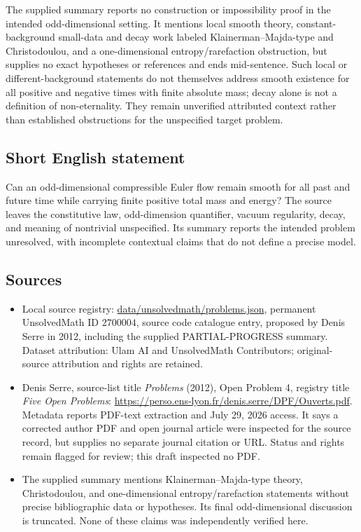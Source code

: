 \documentclass[11pt]{article}
\begin{document}
The supplied summary reports no construction or impossibility proof in the intended odd-dimensional setting. It mentions local smooth theory, constant-background small-data and decay work labeled Klainerman--Majda-type and Christodoulou, and a one-dimensional entropy/rarefaction obstruction, but supplies no exact hypotheses or references and ends mid-sentence. Such local or different-background statements do not themselves address smooth existence for all positive and negative times with finite absolute mass; decay alone is not a definition of non-eternality. They remain unverified attributed context rather than established obstructions for the unspecified target problem.
\subsection{Short English statement}
Can an odd-dimensional compressible Euler flow remain smooth for all past and future time while carrying finite positive total mass and energy? The source leaves the constitutive law, odd-dimension quantifier, vacuum regularity, decay, and meaning of nontrivial unspecified. Its summary reports the intended problem unresolved, with incomplete contextual claims that do not define a precise model.
\subsection{Sources}
\begin{itemize}
\item Local source registry: \url{data/unsolvedmath/problems.json}, permanent UnsolvedMath ID $2700004$, source code catalogue entry, proposed by Denis Serre in 2012, including the supplied PARTIAL-PROGRESS summary. Dataset attribution: Ulam AI and UnsolvedMath Contributors; original-source attribution and rights are retained.
\item Denis Serre, source-list title \emph{Problems} (2012), Open Problem 4, registry title \emph{Five Open Problems}: \url{https://perso.ens-lyon.fr/denis.serre/DPF/Ouverts.pdf}. Metadata reports PDF-text extraction and July 29, 2026 access. It says a corrected author PDF and open journal article were inspected for the source record, but supplies no separate journal citation or URL. Status and rights remain flagged for review; this draft inspected no PDF.
\item The supplied summary mentions Klainerman--Majda-type theory, Christodoulou, and one-dimensional entropy/rarefaction statements without precise bibliographic data or hypotheses. Its final odd-dimensional discussion is truncated. None of these claims was independently verified here.
\end{itemize}
\end{document}
